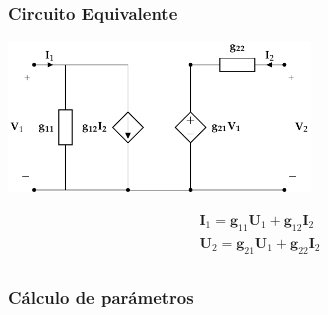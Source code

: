 \subsubsection{Circuito Equivalente}
\label{sec:orga0eb94b}

\includegraphics[height=4cm]{../figs/circuitoEquivalenteG.pdf}


\[
\begin{array}{l}
  \mathbf{I}_1 = \mathbf{g}_{11} \mathbf{U}_1 + \mathbf{g}_{12} \mathbf{I}_2\\
  \mathbf{U}_2 = \mathbf{g}_{21} \mathbf{U}_1 + \mathbf{g}_{22} \mathbf{I}_2\\
\end{array}
\]

\subsubsection{Cálculo de parámetros}
\label{sec:org2365b60}

